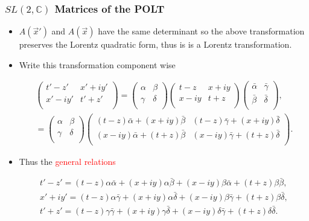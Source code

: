 \documentclass[10pt,a4paper]{beamer}
\begin{document}
\begin{frame}
\frametitle{$SL(2,\mathbb{C})$ Matrices of the POLT}
\begin{itemize}
\item<1->{$A(\vec{x}')$ and $A(\vec{x})$ have the same determinant so the above transformation preserves the Lorentz quadratic form, thus is is a Lorentz transformation.}
\item<2->{Write this transformation component wise

\begin{gather*} 
\left(
\begin{array}{cc}
t' - z' & x' + i y' \\
x' - i y' & t' + z' \\
\end{array}
\right)
=
\left(
\begin{array}{cc}
\alpha & \beta \\
\gamma & \delta \\
\end{array}
\right)
\left(
\begin{array}{cc}
t-z & x + i y \\
x - i y & t + z   \\
\end{array}
\right)
\left(
\begin{array}{cc}
\bar{\alpha} & \bar{\gamma} \\
\bar{\beta} & \bar{\delta} \\
\end{array}
\right), \\
 = \left(
\begin{array}{cc}
\alpha & \beta \\
\gamma & \delta \\
\end{array}
\right)
\left(
\begin{array}{cc}
(t-z)\bar{\alpha} + (x + iy)\bar{\beta} & (t-z)\bar{\gamma} + (x + iy)\bar{\delta} \\
(x - iy)\bar{\alpha} + (t+z)\bar{\beta} & (x-iy)\bar{\gamma} + (t+z)\bar{\delta} \\
\end{array}
\right).
\end{gather*}

}

\item<3->{Thus the \textcolor{red}{general relations}

\begin{gather*}
t' - z'  = (t-z)\alpha\bar{\alpha} + (x + iy)\alpha\bar{\beta} + (x - iy)\beta\bar{\alpha} + (t+z)\beta\bar{\beta},
\\
x' + iy'  = (t-z)\alpha\bar{\gamma} + (x + iy)\alpha\bar{\delta} + (x-iy)\beta\bar{\gamma} + (t+z)\beta\bar{\delta},
\\
t' + z'  = (t-z)\gamma\bar{\gamma} + (x + iy)\gamma\bar{\delta} + (x-iy)\delta\bar{\gamma} + (t+z)\delta\bar{\delta}.
\end{gather*}
}
\end{itemize}



\end{frame}
\end{document}
